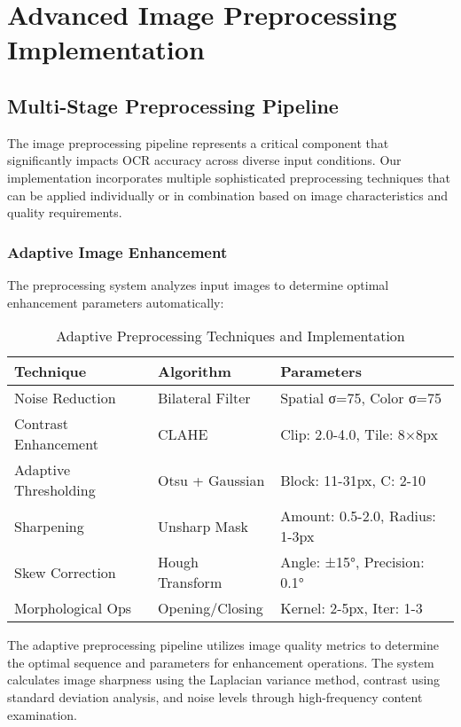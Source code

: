 \section{Advanced Image Preprocessing Implementation}

\subsection{Multi-Stage Preprocessing Pipeline}

The image preprocessing pipeline represents a critical component that significantly impacts OCR accuracy across diverse input conditions. Our implementation incorporates multiple sophisticated preprocessing techniques that can be applied individually or in combination based on image characteristics and quality requirements.

\subsubsection{Adaptive Image Enhancement}

The preprocessing system analyzes input images to determine optimal enhancement parameters automatically:

\begin{table}[H]
\centering
\small
\caption{Adaptive Preprocessing Techniques and Implementation}
\label{tab:preprocessing_adaptive}
\begin{tabular}{lll}
\toprule
\textbf{Technique} & \textbf{Algorithm} & \textbf{Parameters} \\
\midrule
Noise Reduction & Bilateral Filter & Spatial σ=75, Color σ=75 \\
Contrast Enhancement & CLAHE & Clip: 2.0-4.0, Tile: 8×8px \\
Adaptive Thresholding & Otsu + Gaussian & Block: 11-31px, C: 2-10 \\
Sharpening & Unsharp Mask & Amount: 0.5-2.0, Radius: 1-3px \\
Skew Correction & Hough Transform & Angle: ±15°, Precision: 0.1° \\
Morphological Ops & Opening/Closing & Kernel: 2-5px, Iter: 1-3 \\
\bottomrule
\end{tabular}
\end{table}

The adaptive preprocessing pipeline utilizes image quality metrics to determine the optimal sequence and parameters for enhancement operations. The system calculates image sharpness using the Laplacian variance method, contrast using standard deviation analysis, and noise levels through high-frequency content examination.

